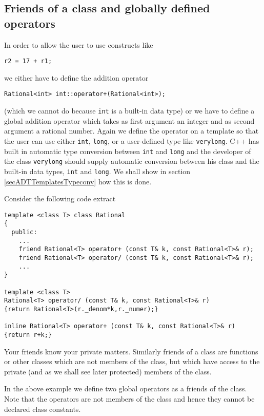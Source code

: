 
\subsection{Friends of a class and globally defined operators}

In order to allow the user to use constructs like
{\footnotesize \begin{verbatim}
r2 = 17 + r1;
\end{verbatim}}
\noindent
we either have to define the addition operator
{\footnotesize \begin{verbatim}
Rational<int> int::operator+(Rational<int>);
\end{verbatim}}
(which we cannot do because \verb+int+ is a built-in
data type) or
we have to define a global addition operator
which takes as first argument an integer and as second
argument a rational number. Again we define the operator
on a template so that the user can use either \verb+int+,
\verb+long+, or a user-defined type like
\verb+verylong+. C++ has built in automatic type
conversion between \verb+int+ and \verb+long+ and the
developer of the class \verb+verylong+ should supply
automatic conversion between his class and the built-in
data types, \verb+int+ and \verb+long+. We shall show
in section \ref{secADTTemplatesTypeconv} how this is done.

Consider the following code extract
{\footnotesize \begin{verbatim}
template <class T> class Rational
{
  public:
    ...
    friend Rational<T> operator+ (const T& k, const Rational<T>& r);
    friend Rational<T> operator/ (const T& k, const Rational<T>& r);
    ...
}

template <class T>
Rational<T> operator/ (const T& k, const Rational<T>& r)
{return Rational<T>(r._denom*k,r._numer);}

inline Rational<T> operator+ (const T& k, const Rational<T>& r)
{return r+k;}
\end{verbatim}}

Your friends know your private matters. Similarly friends of a class
are functions or other classes which are not members of the class,
but which have access to the private (and as we shall see later
protected) members of the class.

In the above example we define two global operators
as a friends of the class. Note that the operators
are not members of the class and hence they cannot be declared
class constants. 


